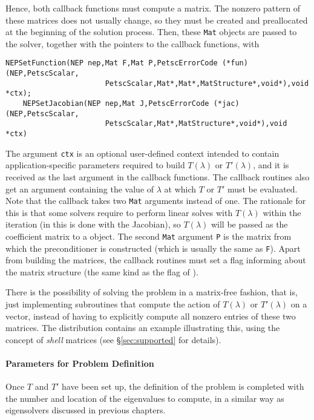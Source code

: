 Hence, both callback functions must compute a matrix. The nonzero pattern of these matrices does not usually change, so they must be created and preallocated at the beginning of the solution process. Then, these \texttt{Mat} objects are passed to the solver, together with the pointers to the callback functions, with
	\begin{Verbatim}[fontsize=\small]
	NEPSetFunction(NEP nep,Mat F,Mat P,PetscErrorCode (*fun)(NEP,PetscScalar,
                       PetscScalar,Mat*,Mat*,MatStructure*,void*),void *ctx);
	NEPSetJacobian(NEP nep,Mat J,PetscErrorCode (*jac)(NEP,PetscScalar,
                       PetscScalar,Mat*,MatStructure*,void*),void *ctx)
	\end{Verbatim}

The argument \texttt{ctx} is an optional user-defined context intended to contain application-specific parameters required to build $T(\lambda)$ or $T'(\lambda)$, and it is received as the last argument in the callback functions. The callback routines also get an argument containing the value of $\lambda$ at which $T$ or $T'$ must be evaluated. Note that the  callback takes two \texttt{Mat} arguments instead of one. The rationale for this is that some  solvers require to perform linear solves with $T(\lambda)$ within the iteration (in  this is done with the Jacobian), so $T(\lambda)$ will be passed as the coefficient matrix to a  object. The second \texttt{Mat} argument \texttt{P} is the matrix from which the preconditioner is constructed (which is usually the same as \texttt{F}). Apart from building the matrices, the callback routines must set a flag informing about the matrix structure (the same kind as the flag of ).

There is the possibility of solving the problem in a matrix-free fashion, that is, just implementing subroutines that compute the action of $T(\lambda)$ or $T'(\lambda)$ on a vector, instead of having to explicitly compute all nonzero entries of these two matrices. The \slepc distribution contains an example illustrating this, using the concept of \emph{shell} matrices (see \S\ref{sec:supported} for details).

\paragraph{Parameters for Problem Definition}

Once $T$ and $T'$ have been set up, the definition of the problem is completed with the number and location of the eigenvalues to compute, in a similar way as eigensolvers discussed in previous chapters.

